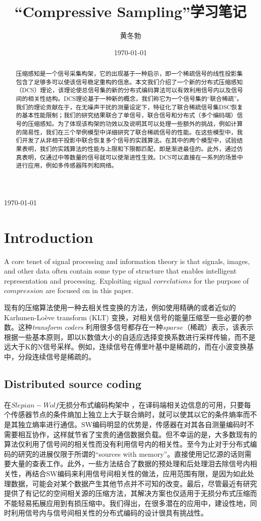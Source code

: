 \documentclass[UTF8]{ctexart}
\title{\heiti ``Compressive Sampling''学习笔记}
\author{\kaishu 黄冬勃}
\date{\today}
\theoremstyle{plain}
\theoremstyle{definition}
\theoremstyle{remark}
\newcommand{\upcite}[1]{\textsuperscript{\textsuperscript{\cite{#1}}}}
\begin{document}
\maketitle
\today
\tableofcontents

\begin{abstract}
压缩感知是一个信号采集构架，它的出现基于一种启示，即一个稀疏信号的线性投影集包含了足够多可以使该信号稳定重构的信息。本文我们介绍了一个新的分布式压缩感知（DCS）理论，该理论使总信号集的新的分布式编码算法可以有效利用信号内以及信号间的相关性结构。DCS理论基于一种新的概念，我们称它为一个信号集的“联合稀疏”。我们的理论贡献在于，在无噪声干扰的测量设定下，特征化了联合稀疏信号集DSC恢复的基本性能限制；我们的研究结果联合了单信号，联合信号和分布式（多个编码端）信号的压缩感知。为了体现该构架的功效以及说明其可以处理一些额外的挑战，例如计算的简易性，我们在三个举例模型中详细研究了联合稀疏信号的性能。在这些模型中，我们开发了从非相干投影中联合恢复多个信号的实践算法。在其中的两个模型中，试验结果表明，我们的实践算法的性能与上限和下限都匹配，即是渐进最佳的。此外，通过仿真表明，仅通过中等数量的信号就可以使渐进性生效。DCS可以直接在一系列的场景中进行应用，例如多传感器阵列和网络。
\end{abstract}

\section{Introduction}
A core tenet of signal processing and information theory is that signals, images, and other data often contain some type of structure that enables intelligent representation and processing. Exploiting signal $correlations$ for the purpose of $compression$ are focused on in this paper.

现有的压缩算法使用一种去相关性变换的方法，例如使用精确的或者近似的 \textcolor[rgb]{1,0,0}{Karhunen-Lo\`{e}ve transform (KLT)} 变换，对相关信号的能量压缩至一些必要的参数。这种\emph{transform coders} 利用很多信号都存在一种$sparse$（稀疏）表示，该表示根据一些基本原则，即以K数值大小的自适应选择变换系数进行采样传输，而不是远大于K的N信号采样。例如，连续信号在傅里叶基中是稀疏的，而在小波变换基中，分段连续信号是稀疏的\upcite{1}。


\subsection{Distributed source coding}
在$Slepian-Wolf$无损分布式编码构架中 \upcite{2,3,4,5}，在译码端相关边信息的可用，只要每个传感器节点的条件熵加上独立上大于联合熵时，就可以使其以它的条件熵率而不是其独立熵率进行通信。SW编码明显的优势是，传感器在对其各自测量编码时不需要相互协作，这样就节省了宝贵的通信数据负载。但不幸运的是，大多数现有的算法\cite{4,5}仅利用了信号间的相关性而没有利用信号内的相关性。至今为止对于分布式编码的研究的进展仅限于所谓的“sources with memory”。直接使用记忆源的话则需要大量的查表工作\cite{2}。此外，一些方法结合了数据的预处理和后处理泪去除信号内相关性，再结合SW编码来利用信号间相关性的做法，应用范围有限，是因为如此处理数据，可能会对某个数据产生其他节点并不可知的改变。最后，尽管最近有研究\cite{6,7,8}提供了有记忆的空间相关源的压缩方法，其解决方案也仅适用于无损分布式压缩而不能轻易拓展应用到有损压缩中。我们得出，在很多潜在的应用中，建设性地，同时利用信号内与信号间相关性的分布式编码的设计很具有挑战性。
\end{document}
